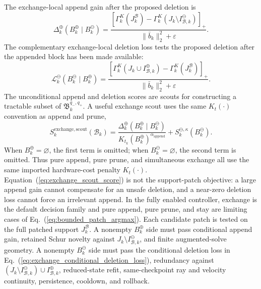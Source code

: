 \documentclass[
  reprint,
  amsmath,
  amssymb,
  aps,
  pra,
  nofootinbib,
  superscriptaddress,
  floatfix
]{revtex4-2}
\newcommand{\app}{\mathrm{append}}
\newcommand{\swap}{\mathrm{exchange}}
\newcommand{\eps}{\varepsilon}
\begin{document}
The exchange-local append gain after the proposed deletion is
\begin{equation}
\Delta_k^{\oplus}(B_k^{\oplus}\mid B_k^{\ominus})
=
\frac{
\left[
\Gamma_k^K(J_k^{\mathcal B})
-
\Gamma_k^K(J_k\setminus I_{\mathcal B,k}^{\ominus})
\right]_+
}{
\|\bar b_k\|_2^2+\eps
}.
\label{eq:exchange_conditional_append_gain}
\end{equation}
The complementary exchange-local deletion loss tests the proposed deletion after
the appended block has been made available:
\begin{equation}
\mathcal L_k^{\ominus}(B_k^{\ominus}\mid B_k^{\oplus})
=
\frac{
\left[
\Gamma_k^K(J_k\cup I_{\mathcal B,k}^{\oplus})
-
\Gamma_k^K(J_k^{\mathcal B})
\right]_+
}{
\|\bar b_k\|_2^2+\eps
}.
\label{eq:exchange_conditional_deletion_loss}
\end{equation}
The unconditional append and deletion scores are scouts for constructing a
tractable subset of \(\mathfrak B_k^{q_-,q_+}\).  A useful exchange scout uses
the same \(K_t(\cdot)\) convention as append and prune,
\begin{equation}
S_k^{\swap,\mathrm{scout}}(\mathcal B_k)
=
\frac{\Delta_k^{\oplus}(B_k^{\oplus}\mid B_k^{\ominus})}{K_{t_k}(B_k^{\oplus})^{\alpha_{\app}}}
+
S_k^{\ominus,\kappa}(B_k^{\ominus}).
\label{eq:exchange_scout_score}
\end{equation}
When \(B_k^{\oplus}=\varnothing\), the first term is omitted; when \(B_k^{\ominus}=\varnothing\), the second term is omitted.  Thus pure append, pure prune, and simultaneous exchange all use the same imported hardware-cost penalty \(K_t(\cdot)\).  Equation~(\ref{eq:exchange_scout_score}) is not the support-patch objective: a large append gain cannot compensate for an unsafe deletion, and a near-zero deletion loss cannot force an irrelevant append.
In the fully enabled controller, exchange is the default decision family and pure append, pure prune, and stay are limiting cases of Eq.~(\ref{eq:bounded_patch_argmax}).  Each candidate patch is tested on the full patched support \(J_k^{\mathcal B}\).  A nonempty \(B_k^{\oplus}\) side must pass conditional append gain, retained Schur novelty against \(J_k\setminus I_{\mathcal B,k}^{\ominus}\), and finite augmented-solve geometry.  A nonempty \(B_k^{\ominus}\) side must pass the conditional deletion loss in Eq.~(\ref{eq:exchange_conditional_deletion_loss}), redundancy against \((J_k\setminus I_{\mathcal B,k}^{\ominus})\cup I_{\mathcal B,k}^{\oplus}\), reduced-state refit, same-checkpoint ray and velocity continuity, persistence, cooldown, and rollback.
\end{document}
